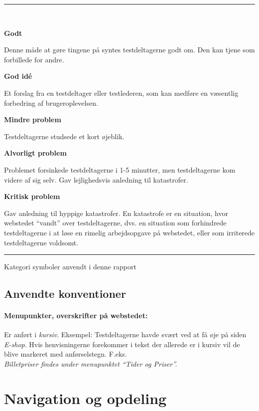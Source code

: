 \documentclass[10pt,a4paper]{article}      %
\newcommand{\kommentar}[2]{\item[#1] \textbf{#2}\par\nopagebreak}{}
\newcommand\pic[1]{\texttt{[image: Pics/\#1]}}
\renewcommand\good{\pic{good}}
\renewcommand\goodidea{\pic{goodidea}}
\renewcommand\smallproblem{\pic{smallproblem}}
\renewcommand\seriousproblem{\pic{seriousproblem}}
\renewcommand\criticalproblem{\pic{criticalproblem}}
\begin{document}
\begin{table}[!ht]
\centering
\rule{\linewidth}{\heavyrulewidth}\\[6mm]
\begin{kommentarer}

\kommentar{\good}{Godt}
Denne måde at gøre tingene på syntes testdeltagerne godt om. Den kan tjene som
forbillede for andre.

\kommentar{\goodidea}{God idé}
Et forslag fra en testdeltager eller testlederen, som kan medføre en væsentlig
forbedring af brugeroplevelsen.

\kommentar{\smallproblem}{Mindre problem}
Testdeltagerne studsede et kort øjeblik.

\kommentar{\seriousproblem}{Alvorligt problem}
Problemet forsinkede testdeltagerne i 1-5 minutter, men testdeltagerne kom
videre af sig selv.  Gav lejlighedsvis anledning til katastrofer.

\kommentar{\criticalproblem}{Kritisk problem}
Gav anledning til hyppige katastrofer. En katastrofe er en situation, hvor
webstedet ``vandt'' over testdeltagerne, dvs. en situation som forhindrede
testdeltagerne i at løse en rimelig arbejdsopgave på webstedet, eller som
irriterede testdeltagerne voldsomt.

\end{kommentarer}
\rule{\linewidth}{\heavyrulewidth}
\caption{Kategori symboler anvendt i denne rapport}
\label{tab:gt}
\end{table}

\subsection{Anvendte konventioner}

\paragraph{Menupunkter, overskrifter på webstedet:}
Er anført i \emph{kursiv}. Eksempel: Testdeltagerne havde svært ved at få øje på siden \emph{E-shop}.
Hvis henvisningerne forekommer i tekst der allerede er i kursiv vil de blive markeret med anførselstegn. F.eks. \\
\emph{Billetpriser findes under menupunktet ``Tider og Priser''.}
\clearpage



\section{Navigation og opdeling}
\end{document}
